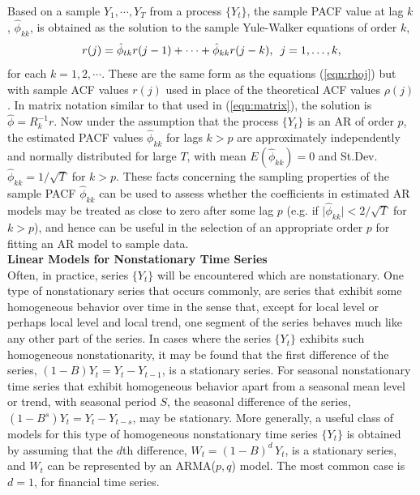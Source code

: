 Based on a sample $Y_1,\cdots,Y_T$ from a process $\{Y_t\}$, the sample PACF value at lag $k$, $\hat{\phi}_{kk}$, is obtained as the solution to the sample Yule-Walker equations of order $k$,
	\begin{equation}\label{eqn:rjequation}
	r(j) = \hat{\phi}_{tk}r(j-1) + \cdots + \hat{\phi}_{kk}r(j-k),\enskip j = 1, \ldots ,k,
	\end{equation}
\noindent for each $k=1,2,\cdots$. These are the same form as the equations (\ref{eqn:rhoj}) but with sample ACF values $r(j)$ used in place of the theoretical ACF values $\rho(j)$. In matrix notation similar to that used in (\ref{eqn:matrix}), the solution is $\hat{\phi} = R_k^{-1}r$. Now under the assumption that the process $\{Y_t\}$ is an AR of order $p$, the estimated PACF values $\hat{\phi}_{kk}$ for lags $k>p$ are approximately independently and normally distributed for large $T$, with mean $E(\hat{\phi}_{kk})=0$ and St.Dev. $\hat{\phi}_{kk} = 1/\sqrt{T}$ for $k>p$. These facts concerning the sampling properties of the sample PACF $\hat{\phi}_{kk}$ can be used to assess whether the coefficients in estimated AR models may be treated as close to zero after some lag $p$ (e.g. if $\lvert\hat{\phi}_{kk}\rvert < 2/\sqrt{T}$ for $k>p$), and hence can be useful in the selection of an appropriate order $p$ for fitting an AR model to sample data. \\


\noindent\textbf{Linear Models for Nonstationary Time Series} \\


Often, in practice, series $\{Y_t\}$ will be encountered which are nonstationary. One type of nonstationary series that occurs commonly, are series that exhibit some homogeneous behavior over time in the sense that, except for local level or perhaps local level and local trend, one segment of the series behaves much like any other part of the series. In cases where the series $\{Y_t\}$ exhibits such homogeneous nonstationarity, it may be found that the first difference of the series, $(1 - B)Y_t = Y_t - Y_{t-1}$, is a stationary series. For seasonal nonstationary time series that exhibit homogeneous behavior apart from a seasonal mean level or trend, with seasonal period $S$, the seasonal difference of the series, $(1 - B^s)Y_t = Y_t - Y_{t-s}$, may be stationary. More generally, a useful class of models for this type of homogeneous nonstationary time series $\{Y_t\}$ is obtained by assuming that the $d$th difference, $W_t = (1 - B)^d\,Y_t$, is a stationary series, and $W_t$ can be represented by an ARMA($p,q$) model. The most common case is $d=1$, for financial time series. \\


